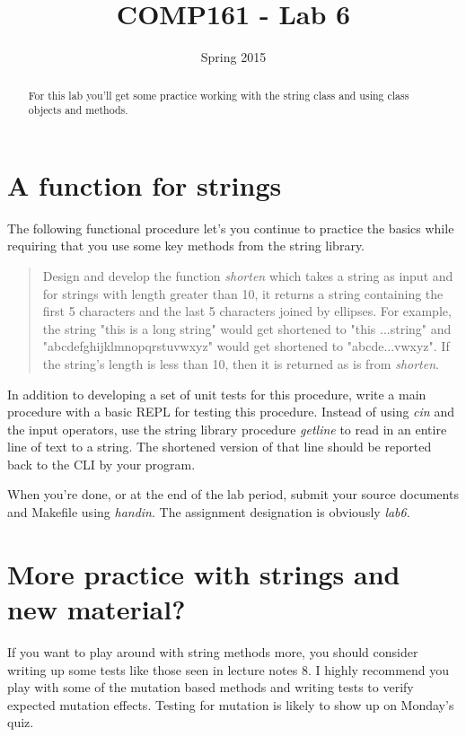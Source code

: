 \documentclass[]{tufte-handout}
\title{COMP161 - Lab 6 }
\author{}
\date{Spring 2015}
\begin{document}
\maketitle

\begin{abstract}
For this lab you'll get some practice working with the string class and using class objects and methods. 
\end{abstract}

\section{ A function for strings }

The following functional procedure let's you continue to practice the basics while requiring that you use some key methods from the string library. 
\begin{quote}
Design and develop the function \textit{shorten} which takes a string as input and for strings with length greater than 10, it returns a string containing the first 5 characters and the last 5 characters joined by ellipses. For example, the string "this is a long string" would get shortened to "this ...string" and "abcdefghijklmnopqrstuvwxyz" would get shortened to "abcde...vwxyz". If the string's length is less than 10, then it is returned as is from \textit{shorten}. 
\end{quote}
In addition to developing a set of unit tests for this procedure, write a main procedure with a basic REPL for testing this procedure. Instead of using \textit{cin} and the input operators, use the string library procedure \textit{getline} to read in an entire line of text to a string. The shortened version of that line should be reported back to the CLI by your program.

When you're done, or at the end of the lab period, submit your source documents and Makefile using \textit{handin}. The assignment designation is obviously \textit{lab6}. 

\section{ More practice with strings and new material? }

If you want to play around with string methods more, you should consider writing up some tests like those seen in lecture notes 8. I highly recommend you play with some of the mutation based methods and writing tests to verify expected mutation effects. Testing for mutation is likely to show up on Monday's quiz.
\end{document}
